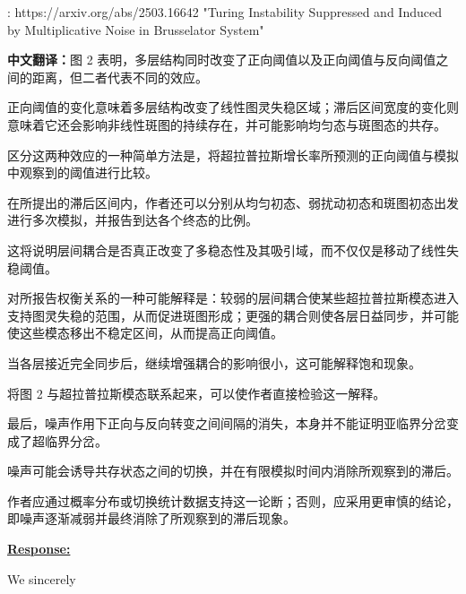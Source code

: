 \documentclass[a4paper,12pt]{article}
\newcommand{\zhtranslationfirst}[1]{%
    \par\medskip\noindent
    {\small\color{blue!60!black}\textbf{中文翻译：}#1}\par
}
\newcommand{\zhtranslation}[1]{%
    \par\smallskip\noindent
    {\small\color{blue!60!black}#1}\par
}
\begin{document}
\begin{tcolorbox}[title = {Comment 5 Turing instability, hysteresis and multistability},fonttitle = \bfseries]
    [1]: https://arxiv.org/abs/2503.16642 "Turing Instability Suppressed and Induced by Multiplicative Noise in Brusselator System"

    \zhtranslationfirst{图 2 表明，多层结构同时改变了正向阈值以及正向阈值与反向阈值之间的距离，但二者代表不同的效应。}
    \zhtranslation{正向阈值的变化意味着多层结构改变了线性图灵失稳区域；滞后区间宽度的变化则意味着它还会影响非线性斑图的持续存在，并可能影响均匀态与斑图态的共存。}

    \zhtranslation{区分这两种效应的一种简单方法是，将超拉普拉斯增长率所预测的正向阈值与模拟中观察到的阈值进行比较。}
    \zhtranslation{在所提出的滞后区间内，作者还可以分别从均匀初态、弱扰动初态和斑图初态出发进行多次模拟，并报告到达各个终态的比例。}
    \zhtranslation{这将说明层间耦合是否真正改变了多稳态性及其吸引域，而不仅仅是移动了线性失稳阈值。}

    \zhtranslation{对所报告权衡关系的一种可能解释是：较弱的层间耦合使某些超拉普拉斯模态进入支持图灵失稳的范围，从而促进斑图形成；更强的耦合则使各层日益同步，并可能使这些模态移出不稳定区间，从而提高正向阈值。}
    \zhtranslation{当各层接近完全同步后，继续增强耦合的影响很小，这可能解释饱和现象。}
    \zhtranslation{将图 2 与超拉普拉斯模态联系起来，可以使作者直接检验这一解释。}

    \zhtranslation{最后，噪声作用下正向与反向转变之间间隔的消失，本身并不能证明亚临界分岔变成了超临界分岔。}
    \zhtranslation{噪声可能会诱导共存状态之间的切换，并在有限模拟时间内消除所观察到的滞后。}
    \zhtranslation{作者应通过概率分布或切换统计数据支持这一论断；否则，应采用更审慎的结论，即噪声逐渐减弱并最终消除了所观察到的滞后现象。}
\end{tcolorbox}

\noindent \underline {\textbf{Response:}}
\bigskip

We sincerely

\end{document}
